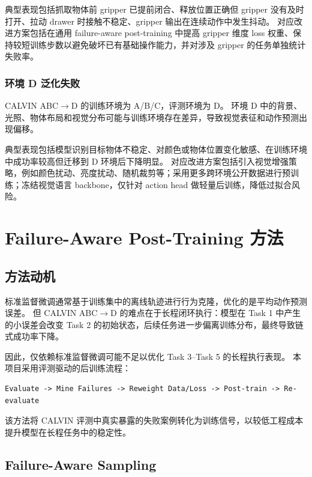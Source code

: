 \documentclass[10pt,a4paper,fontset=none]{ctexart}
\begin{document}
典型表现包括抓取物体前 gripper 已提前闭合、释放位置正确但 gripper 没有及时打开、拉动 drawer 时接触不稳定、gripper 输出在连续动作中发生抖动。
对应改进方案包括在通用 failure-aware post-training 中提高 gripper 维度 loss 权重、保持较短训练步数以避免破坏已有基础操作能力，并对涉及 gripper 的任务单独统计失败率。

\subsubsection{环境 D 泛化失败}

CALVIN ABC$\rightarrow$D 的训练环境为 A/B/C，评测环境为 D。
环境 D 中的背景、光照、物体布局和视觉分布可能与训练环境存在差异，导致视觉表征和动作预测出现偏移。

典型表现包括模型识别目标物体不稳定、对颜色或物体位置变化敏感、在训练环境中成功率较高但迁移到 D 环境后下降明显。
对应改进方案包括引入视觉增强策略，例如颜色扰动、亮度扰动、随机裁剪等；采用更多跨环境公开数据进行预训练；冻结视觉语言 backbone，仅针对 action head 做轻量后训练，降低过拟合风险。

\section{Failure-Aware Post-Training 方法}

\subsection{方法动机}

标准监督微调通常基于训练集中的离线轨迹进行行为克隆，优化的是平均动作预测误差。
但 CALVIN ABC$\rightarrow$D 的难点在于长程闭环执行：模型在 Task 1 中产生的小误差会改变 Task 2 的初始状态，后续任务进一步偏离训练分布，最终导致链式成功率下降。

因此，仅依赖标准监督微调可能不足以优化 Task 3--Task 5 的长程执行表现。
本项目采用评测驱动的后训练流程：

\begin{lstlisting}[caption={评测驱动后训练流程}]
Evaluate -> Mine Failures -> Reweight Data/Loss -> Post-train -> Re-evaluate
\end{lstlisting}

该方法将 CALVIN 评测中真实暴露的失败案例转化为训练信号，以较低工程成本提升模型在长程任务中的稳定性。

\subsection{Failure-Aware Sampling}
\end{document}
